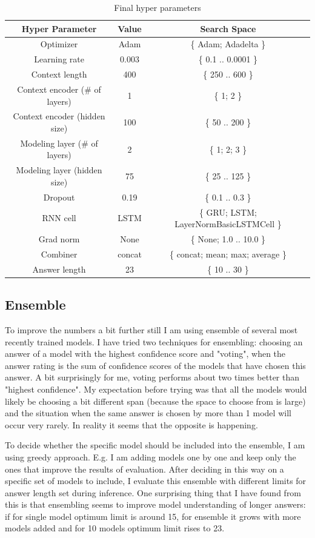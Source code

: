 \documentclass{article}
\begin{document}
\begin{table}[h!]
\centering
\setlength{\arrayrulewidth}{0.5mm}
\begin{tabular}{|c || c | c |} 
 \hline
 Hyper Parameter & Value & Search Space \\
 \hline
 Optimizer & Adam & \{ Adam; Adadelta \} \\
 Learning rate & 0.003 & \{ 0.1 .. 0.0001 \} \\
 Context length & 400 & \{ 250 .. 600 \} \\
 Context encoder (\# of layers) & 1 &  \{ 1; 2 \} \\
 Context encoder (hidden size) & 100 &  \{ 50 .. 200 \} \\
 Modeling layer (\# of layers) & 2 &  \{ 1; 2; 3 \} \\
 Modeling layer (hidden size) & 75 &  \{ 25 .. 125 \} \\
 Dropout & 0.19 &  \{ 0.1 .. 0.3 \} \\
 RNN cell & LSTM & \{ GRU; LSTM; LayerNormBasicLSTMCell \} \\
 Grad norm & None & \{ None; 1.0 .. 10.0 \} \\
 Combiner & concat & \{ concat; mean; max; average \} \\
 Answer length & 23 & \{ 10 .. 30 \} \\
 \hline
\end{tabular}
\captionsetup{format=plain, font=large, labelfont=bf}
\caption{Final hyper parameters}
\end{table}

\subsection{Ensemble}
To improve the numbers a bit further still I am using ensemble of several most recently trained models. I have tried two techniques for ensembling: choosing an answer of a model with the highest confidence score and "voting", when the answer rating is the sum of confidence scores of the models that have chosen this answer. A bit surprisingly for me, voting performs about two times better than "highest confidence". My expectation before trying was that all the models would likely be choosing a bit different span (because the space to choose from is large) and the situation when the same answer is chosen by more than 1 model will occur very rarely. In reality it seems that the opposite is happening.

To decide whether the specific model should be included into the ensemble, I am using greedy approach. E.g. I am adding models one by one and keep only the ones that improve the results of evaluation. After deciding in this way on a specific set of models to include, I evaluate this ensemble with different limits for answer length set during inference. One surprising thing that I have found from this is that ensembling seems to improve model understanding of longer answers: if for single model optimum limit is around 15, for ensemble it grows with more models added and for 10 models optimum limit rises to 23.
\end{document}
